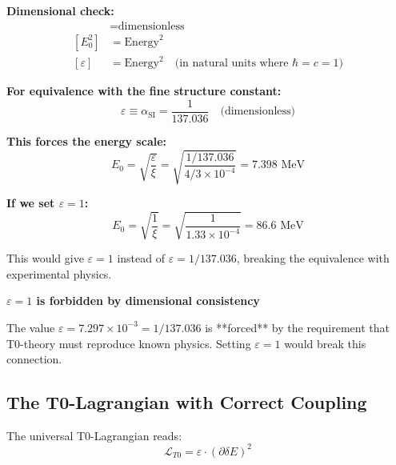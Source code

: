 \documentclass[12pt,a4paper]{article}
\numberwithin{equation}{section}
\newcommand{\xipar}{\xi}
\newcommand{\epsilonT}{\varepsilon}
\newcommand{\alphaSI}{\alpha_{\text{SI}}}
\newcommand{\calL}{\mathcal{L}}
\newcommand{\Eo}{E_0}
\begin{document}
	\textbf{Dimensional check:}
	\begin{align}
		[\xipar] &= \text{dimensionless} \\
		[\Eo^2] &= \text{Energy}^2 \\
		[\epsilonT] &= \text{Energy}^2 \quad \text{(in natural units where } \hbar = c = 1\text{)}
		\label{eq:dimensions}
	\end{align}
	
	\textbf{For equivalence with the fine structure constant:}
	\begin{equation}
		\epsilonT \equiv \alphaSI = \frac{1}{137.036} \quad \text{(dimensionless)}
		\label{eq:equivalence_simple}
	\end{equation}
	
	\textbf{This forces the energy scale:}
	\begin{equation}
		\Eo = \sqrt{\frac{ \epsilonT}{\xipar}} = \sqrt{\frac{1/137.036}{4/3 \times 10^{-4}}} = 7.398 \text{ MeV}
		\label{eq:e0_forced}
	\end{equation}
	
	\textbf{If we set $\epsilonT = 1$:}
	\begin{equation}
		\Eo = \sqrt{\frac{1}{\xipar}} = \sqrt{\frac{1}{1.33 \times 10^{-4}}} = 86.6 \text{ MeV}
		\label{eq:e0_wrong}
	\end{equation}
	
	This would give $\epsilonT = 1$ instead of $\epsilonT = 1/137.036$, breaking the equivalence with experimental physics.
	
	\begin{tcolorbox}[title={\textbf{CONCLUSION}},colframe=blue,colback=blue!5]
		\textbf{$\epsilonT = 1$ is forbidden by dimensional consistency}
		
		The value $\epsilonT = 7.297 \times 10^{-3} = 1/137.036$ is **forced** by the requirement that T0-theory must reproduce known physics. Setting $\epsilonT = 1$ would break this connection.
	\end{tcolorbox}
	
	
	
	
	
	\subsection{The T0-Lagrangian with Correct Coupling}
	
	The universal T0-Lagrangian reads:
	\begin{equation}
		\calL_{T0} = \epsilonT \cdot (\partial \delta E)^2
		\label{eq:t0_lagrangian}
	\end{equation}
	
\end{document}
